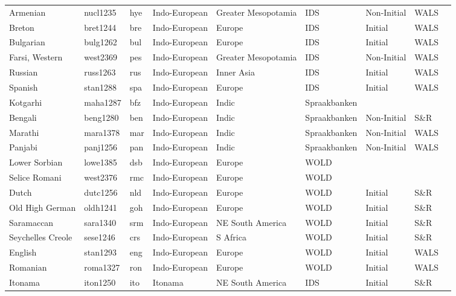 \begin{longtable}{lllllllll}
  Armenian & nucl1235 & hye & Indo-European & Greater Mesopotamia & IDS & Non-Initial & WALS &  \\ 
  Breton & bret1244 & bre & Indo-European & Europe & IDS & Initial & WALS &  \\ 
  Bulgarian & bulg1262 & bul & Indo-European & Europe & IDS & Initial & WALS &  \\ 
  Farsi, Western & west2369 & pes & Indo-European & Greater Mesopotamia & IDS & Non-Initial & WALS &  \\ 
  Russian & russ1263 & rus & Indo-European & Inner Asia & IDS & Initial & WALS &  \\ 
  Spanish & stan1288 & spa & Indo-European & Europe & IDS & Initial & WALS &  \\ 
  Kotgarhi & maha1287 & bfz & Indo-European & Indic & Spraakbanken &  &  &  \\ 
  Bengali & beng1280 & ben & Indo-European & Indic & Spraakbanken & Non-Initial & S\&R & \cite[63...]{hudson_bengali1965.pdf} \\ 
  Marathi & mara1378 & mar & Indo-European & Indic & Spraakbanken & Non-Initial & WALS &  \\ 
  Panjabi & panj1256 & pan & Indo-European & Indic & Spraakbanken & Non-Initial & WALS &  \\ 
  Lower Sorbian & lowe1385 & dsb & Indo-European & Europe & WOLD &  &  &  \\ 
  Selice Romani & west2376 & rmc & Indo-European & Europe & WOLD &  &  &  \\ 
  Dutch & dutc1256 & nld & Indo-European & Europe & WOLD & Initial & S\&R & \cite[]{} \\ 
  Old High German & oldh1241 & goh & Indo-European & Europe & WOLD & Initial & S\&R & \cite[54]{axel_old-high-german-syntax2007.pdf} \\ 
  Saramaccan & sara1340 & srm & Indo-European & NE South America & WOLD & Initial & S\&R & \cite[30]{byrne_saramaccan1985.pdf} \\ 
  Seychelles Creole & sese1246 & crs & Indo-European & S Africa & WOLD & Initial & S\&R & \cite[187]{corne_seychelles-creole1977.pdf} \\ 
  English & stan1293 & eng & Indo-European & Europe & WOLD & Initial & WALS &  \\ 
  Romanian & roma1327 & ron & Indo-European & Europe & WOLD & Initial & WALS &  \\ 
  Itonama & iton1250 & ito & Itonama & NE South America & IDS & Initial & S\&R & \cite[251,255]{crevels_itonama2012_o} \\ 

\end{longtable}

